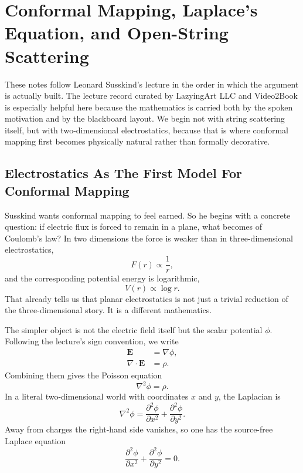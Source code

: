 \chapter{Conformal Mapping, Laplace's Equation, and Open-String Scattering}

These notes follow Leonard Susskind's lecture in the order in which the argument is actually built. The lecture record curated by LazyingArt LLC and Video2Book is especially helpful here because the mathematics is carried both by the spoken motivation and by the blackboard layout. We begin not with string scattering itself, but with two-dimensional electrostatics, because that is where conformal mapping first becomes physically natural rather than formally decorative.

\section{Electrostatics As The First Model For Conformal Mapping}

Susskind wants conformal mapping to feel earned. So he begins with a concrete question: if electric flux is forced to remain in a plane, what becomes of Coulomb's law? In two dimensions the force is weaker than in three-dimensional electrostatics,
\begin{equation}
F(r)\propto \frac{1}{r},
\end{equation}
and the corresponding potential energy is logarithmic,
\begin{equation}
V(r)\propto \log r.
\end{equation}
That already tells us that planar electrostatics is not just a trivial reduction of the three-dimensional story. It is a different mathematics.

The simpler object is not the electric field itself but the scalar potential \(\phi\). Following the lecture's sign convention, we write
\begin{align}
\mathbf E &= \nabla \phi, \\
\nabla\cdot \mathbf E &= \rho.
\end{align}
Combining them gives the Poisson equation
\begin{equation}
\nabla^2\phi=\rho.
\end{equation}
In a literal two-dimensional world with coordinates \(x\) and \(y\), the Laplacian is
\begin{equation}
\nabla^2\phi=\frac{\partial^2\phi}{\partial x^2}+\frac{\partial^2\phi}{\partial y^2}.
\end{equation}
Away from charges the right-hand side vanishes, so one has the source-free Laplace equation
\begin{equation}
\frac{\partial^2\phi}{\partial x^2}+\frac{\partial^2\phi}{\partial y^2}=0.
\end{equation}

